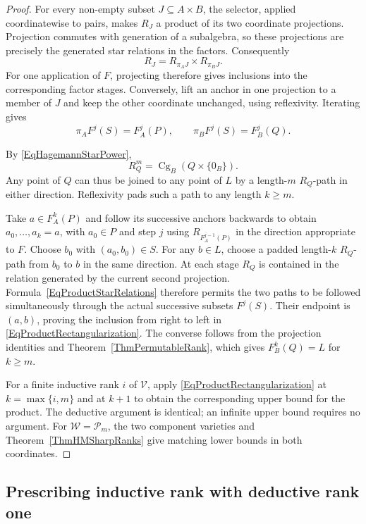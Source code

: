 \documentclass[12pt,english]{amsart}
\theoremstyle{definition}
\numberwithin{equation}{section}
\theoremstyle{remark}
\begin{document}
\begin{proof}
For every non-empty subset $J\subseteq A\times B$, the selector,
applied coordinatewise to pairs, makes $R_J$ a product of its two
coordinate projections. Projection commutes with generation of a
subalgebra, so these projections are precisely the generated star
relations in the factors. Consequently
\begin{equation}\label{EqProductStarRelations}
R_J=R_{\pi_AJ}\times R_{\pi_BJ}.
\end{equation}
For one application of $F$, projecting therefore gives inclusions
into the corresponding factor stages. Conversely, lift an anchor
in one projection to a member of $J$ and keep the other coordinate
unchanged, using reflexivity. Iterating gives
\[
\pi_A F^j(S)=F_A^j(P),\qquad
\pi_B F^j(S)=F_B^j(Q).
\]

By \eqref{EqHagemannStarPower},
\[
R_Q^m=\operatorname{Cg}_B(Q\times\{0_B\}).
\]
Any point of $Q$ can thus be joined to any point of $L$ by a
length-$m$ $R_Q$-path in either direction. Reflexivity pads such
a path to any length $k\geqslant m$.

Take $a\in F_A^k(P)$ and follow its successive anchors backwards
to obtain $a_0,\ldots,a_k=a$, with $a_0\in P$ and step $j$ using
$R_{F_A^{j-1}(P)}$ in the direction appropriate to $F$. Choose
$b_0$ with $(a_0,b_0)\in S$. For any $b\in L$, choose a padded
length-$k$ $R_Q$-path from $b_0$ to $b$ in the same direction.
At each stage $R_Q$ is contained in the relation generated by the
current second projection. Formula~\eqref{EqProductStarRelations}
therefore permits the two paths to be followed simultaneously
through the actual successive subsets $F^j(S)$. Their endpoint
is $(a,b)$, proving the inclusion from right to left in
\eqref{EqProductRectangularization}. The converse follows from
the projection identities and Theorem~\ref{ThmPermutableRank},
which gives $F_B^k(Q)=L$ for $k\geqslant m$.

For a finite inductive rank $i$ of $\mathcal V$, apply
\eqref{EqProductRectangularization} at $k=\max\{i,m\}$ and at
$k+1$ to obtain the corresponding upper bound for the product.
The deductive argument is identical; an infinite upper bound
requires no argument. For $\mathcal W=\mathcal P_m$, the two
component varieties and Theorem~\ref{ThmHMSharpRanks} give
matching lower bounds in both coordinates.
\end{proof}

\subsection{Prescribing inductive rank with deductive rank one}
\label{SubsecAnnihilatingSpectrum}
\end{document}
